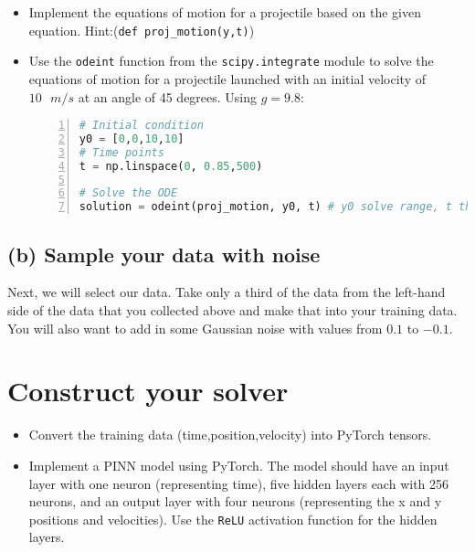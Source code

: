 \documentclass{article}
\begin{document}
\begin{itemize}
    \item Implement the equations of motion for a projectile based on the given equation. Hint:(\texttt{def proj\_motion(y,t)})
    \item Use the \texttt{odeint} function from the \texttt{scipy.integrate} module to solve the equations of motion for a projectile launched with an initial velocity of $10\text{ } m/s$ at an angle of 45 degrees. Using $g = 9.8$:
    \begin{lstlisting}[language=Python, numbers=left, stepnumber=1, firstline=1,frame=single]
# Initial condition
y0 = [0,0,10,10]
# Time points
t = np.linspace(0, 0.85,500)

# Solve the ODE
solution = odeint(proj_motion, y0, t) # y0 solve range, t the linspace  
    \end{lstlisting}
\end{itemize}


\subsection{(b) Sample your data with noise}

Next, we will select our data. Take only a third of the data from the left-hand side of the data that you collected above and make that into your training data. You will also want to add in some Gaussian noise with values from $0.1$ to $-0.1$.

\section{Construct your solver}

\begin{itemize}
    \item Convert the training data (time,position,velocity) into PyTorch tensors.
    \item Implement a PINN model using PyTorch. The model should have an input layer with one neuron (representing time), five hidden layers each with 256 neurons, and an output layer with four neurons (representing the x and y positions and velocities). Use the \texttt{ReLU} activation function for the hidden layers.
\end{itemize}
\end{document}
